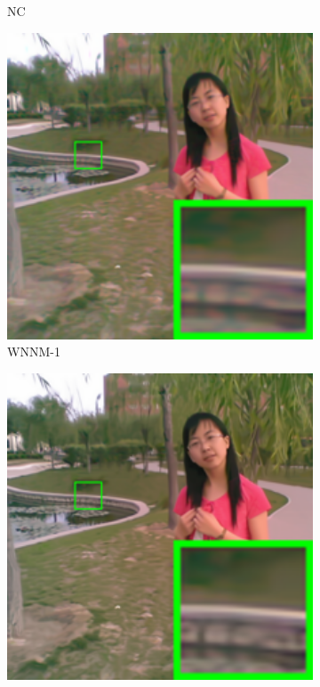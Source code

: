 \begin{figure}
\begin{subfigure}[t]{0.19\textwidth}
		\caption{NC}
    \end{subfigure}
    \hfill
    \begin{subfigure}[t]{0.19\textwidth}
        \centering
        \includegraphics[width=1\textwidth]{images/mcwnnm/nc/resize_br_WNNMcw_chinesegirl.png}
		\caption{WNNM-1}
    \end{subfigure}
    \hfill
    \begin{subfigure}[t]{0.19\textwidth}
        \centering
        \includegraphics[width=1\textwidth]{images/mcwnnm/nc/resize_br_WNNMJ_chinesegirl.png}

\end{subfigure}
\end{figure}
